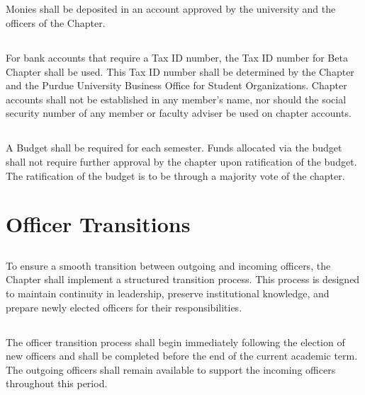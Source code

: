 \documentclass[10pt, oneside]{article}
\begin{document}
\subsection{}
Monies shall be deposited in an account approved by the university and the officers of the Chapter.

\subsection{}
For bank accounts that require a Tax ID number, the Tax ID number for Beta Chapter shall be used. This Tax ID number shall be determined by the Chapter and the Purdue University Business Office for Student Organizations. Chapter accounts shall not be established in any member’s name, nor should the social security number of any member or faculty adviser be used on chapter accounts.

\subsection{}
A Budget shall be required for each semester. Funds allocated via the budget shall not require further approval by the chapter upon ratification of the budget. The ratification of the budget is to be through a majority vote of the chapter.

\section{Officer Transitions}
\subsection{}
To ensure a smooth transition between outgoing and incoming officers, the Chapter shall implement a structured transition process. This process is designed to maintain continuity in leadership, preserve institutional knowledge, and prepare newly elected officers for their responsibilities.

\subsection{}
The officer transition process shall begin immediately following the election of new officers and shall be completed before the end of the current academic term. The outgoing officers shall remain available to support the incoming officers throughout this period.
\end{document}
